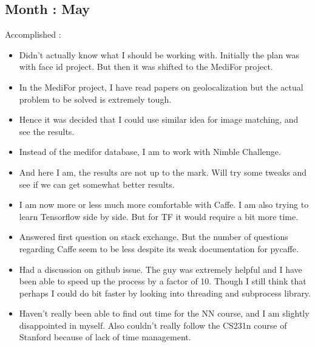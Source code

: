 \documentclass{article}
\begin{document}
\subsection{Month : May}
Accomplished :
\begin{itemize}
\item Didn't actually know what I should be working with. Initially the plan was with face id project. But then it was shifted to the MediFor project.
\item In the MediFor project, I have read papers on geolocalization but the actual problem to be solved is extremely tough.
\item Hence it was decided that I could use similar idea for image matching, and see the results.
\item Instead of the medifor database, I am to work with Nimble Challenge.
\item And here I am, the results are not up to the mark. Will try some tweaks and see if we can get somewhat better results.
\item I am now more or less much more comfortable with Caffe. I am also trying to learn Tensorflow side by side. But for TF it would require a bit more time.
\item Answered first question on stack exchange. But the number of questions regarding Caffe seem to be less despite its weak documentation for pycaffe.
\item Had a discussion on github issue. The guy was extremely helpful and I have been able to speed up the process by a factor of 10. Though I still think that perhaps I could do bit faster by looking into threading and subprocess library.
\item Haven't really been able to find out time for the NN course, and I am slightly disappointed in myself. Also couldn't really follow the CS231n course of Stanford because of lack of time management.
\end{itemize}
\end{document}
